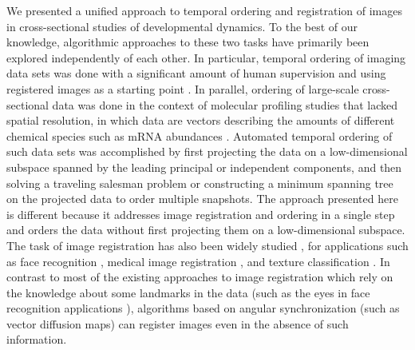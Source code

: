 \documentclass{pnastwo}
\begin{document}
\begin{article}
We presented a unified approach to temporal ordering and registration of images in cross-sectional studies of developmental dynamics. 
%
To the best of our knowledge, algorithmic approaches to these two tasks have primarily been explored independently of each other. 
%
In particular, temporal ordering of imaging data sets was done with a significant amount of human supervision and using registered images as a starting point \cite{yuan2014automated, surkova2008characterization}.  
%
In parallel, ordering of large-scale cross-sectional data was done in the context of molecular profiling studies that lacked spatial resolution, in which data are vectors describing the amounts of different chemical species such as mRNA abundances \cite{trapnell2014dynamics, anavy2014blind, gupta2008extracting}. 
%
Automated temporal ordering of such data sets was accomplished by first projecting the data on a low-dimensional subspace spanned by the leading principal or independent components, and then solving a traveling salesman problem or constructing a minimum spanning tree on the projected data to order multiple snapshots. 
%
The approach presented here is different because it addresses image registration and ordering in a single step and orders the data without first projecting them on a low-dimensional subspace. 
%
The task of image registration has also been widely studied \cite{zitova2003image}, for applications such as face recognition \cite{rowley1998rotation}, medical image registration \cite{hajnal2010medical}, and texture classification \cite{greenspan1994rotation}.
%
In contrast to most of the existing approaches to image registration which rely on the knowledge about some landmarks in the data \cite{ian1998statistical} (such as the eyes in face recognition applications \cite{zhao2003face}), algorithms based on angular synchronization (such as vector diffusion maps) can register images even in the absence of such information. 


\end{article}
\end{document}
